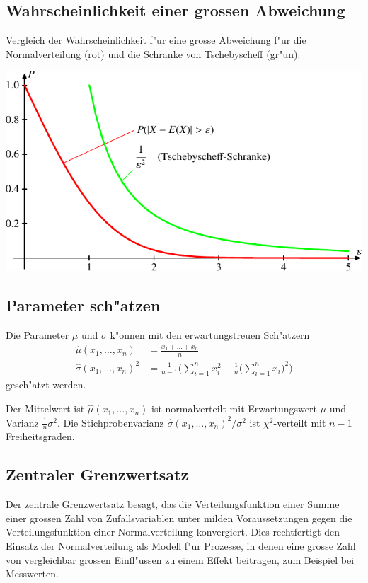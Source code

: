 \subsection{Wahrscheinlichkeit einer grossen Abweichung}
Vergleich der Wahrscheinlichkeit f"ur eine grosse Abweichung
f"ur die Normalverteilung (rot) und die Schranke von Tschebyscheff (gr"un):
\begin{center}
\includegraphics{images/norm-1.pdf}
\end{center}

\subsection{Parameter sch"atzen}
Die Parameter $\mu$ und $\sigma$ k"onnen mit den erwartungstreuen Sch"atzern
\begin{align*}
\hat\mu(x_1,\dots,x_n)&=\frac{x_1+\dots+x_n}{n}\\
\hat\sigma(x_1,\dots,x_n)^2&=\frac{1}{n-1}\biggl(
\sum_{i=1}^n x_i^2 - \frac1n\biggl(\sum_{i=1}^n x_i\biggr)^2
\biggr)
\end{align*}
gesch"atzt werden.

Der Mittelwert ist $\hat\mu(x_1,\dots,x_n)$ ist normalverteilt mit Erwartungswert
$\mu$ und Varianz $\frac1n\sigma^2$.
Die Stichprobenvarianz $\hat\sigma(x_1,\dots,x_n)^2/\sigma^2$ ist $\chi^2$-verteilt
mit $n-1$ Freiheitsgraden.

\subsection{Zentraler Grenzwertsatz}
Der zentrale Grenzwertsatz besagt, das die Verteilungsfunktion einer Summe
einer grossen Zahl von Zufallsvariablen unter milden Voraussetzungen
gegen die Verteilungsfunktion einer Normalverteilung konvergiert.
Dies rechtfertigt den Einsatz der Normalverteilung als Modell f"ur Prozesse,
in denen eine grosse Zahl von vergleichbar grossen Einfl"ussen zu einem Effekt
beitragen, zum Beispiel bei Messwerten.


